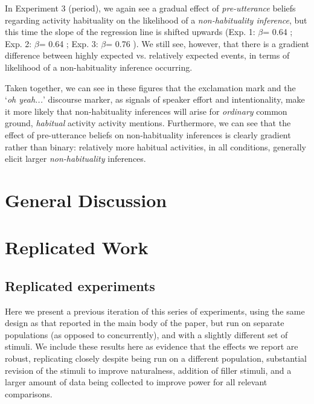\documentclass{sp}\usepackage[]{graphicx}\usepackage[]{color}
\begin{document}
In Experiment 3 (period), we again see a gradual effect of \textit{pre-utterance} beliefs regarding activity habituality on the likelihood of a \textit{non-habituality inference}, but this time the slope of the regression line is shifted upwards (Exp. 1: $\beta$=%
0.64
; Exp. 2: $\beta$=%
0.64
; Exp. 3: $\beta$=%
0.76
). We still see, however, that there is a gradient difference between highly expected vs. relatively expected events, in terms of likelihood of a non-habituality inference occurring.

Taken together, we can see in these figures that the exclamation mark and the `\textit{oh yeah...}' discourse marker, as signals of speaker effort and intentionality, make it more likely that non-habituality inferences will arise for \textit{ordinary} common ground, \textit{habitual} activity activity mentions. Furthermore, we can see that the effect of pre-utterance beliefs on non-habituality inferences is clearly gradient rather than binary: relatively more habitual activities, in all conditions, generally elicit larger \textit{non-habituality} inferences.

\section{General Discussion}\label{disc}





\appendix

\pagebreak

\section{Replicated Work}\label{appendix}



\setcounter{secnumdepth}{5}

\subsection{Replicated experiments}

Here we present a previous iteration of this series of experiments, using the same design as that reported in the main body of the paper, but run on separate populations (as opposed to concurrently), and with a slightly different set of stimuli. We include these results here as evidence that the effects we report are robust, replicating closely despite being run on a different population, substantial revision of the stimuli to improve naturalness, addition of filler stimuli, and a larger amount of data being collected to improve power for all relevant comparisons.
\end{document}
